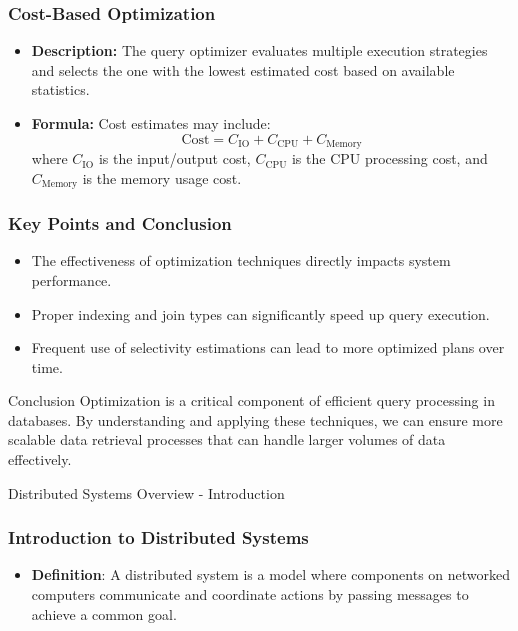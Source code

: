 \documentclass[aspectratio=169]{beamer}
\begin{document}
\begin{frame}[fragile]
    \frametitle{Cost-Based Optimization}
    \begin{itemize}
        \item \textbf{Description:} The query optimizer evaluates multiple execution strategies and selects the one with the lowest estimated cost based on available statistics.
        \item \textbf{Formula:} Cost estimates may include:
        \begin{equation}
            \text{Cost} = C_{\text{IO}} + C_{\text{CPU}} + C_{\text{Memory}}
        \end{equation}
        where \(C_{\text{IO}}\) is the input/output cost, \(C_{\text{CPU}}\) is the CPU processing cost, and \(C_{\text{Memory}}\) is the memory usage cost.
    \end{itemize}
\end{frame}

\begin{frame}[fragile]
    \frametitle{Key Points and Conclusion}
    \begin{itemize}
        \item The effectiveness of optimization techniques directly impacts system performance.
        \item Proper indexing and join types can significantly speed up query execution.
        \item Frequent use of selectivity estimations can lead to more optimized plans over time.
    \end{itemize}
    \begin{block}{Conclusion}
        Optimization is a critical component of efficient query processing in databases. By understanding and applying these techniques, we can ensure more scalable data retrieval processes that can handle larger volumes of data effectively.
    \end{block}
\end{frame}

\begin{frame}[fragile]{Distributed Systems Overview - Introduction}
    \frametitle{Introduction to Distributed Systems}
    \begin{itemize}
        \item \textbf{Definition}: A distributed system is a model where components on networked computers communicate and coordinate actions by passing messages to achieve a common goal.
    \end{itemize}
\end{frame}
\end{document}
